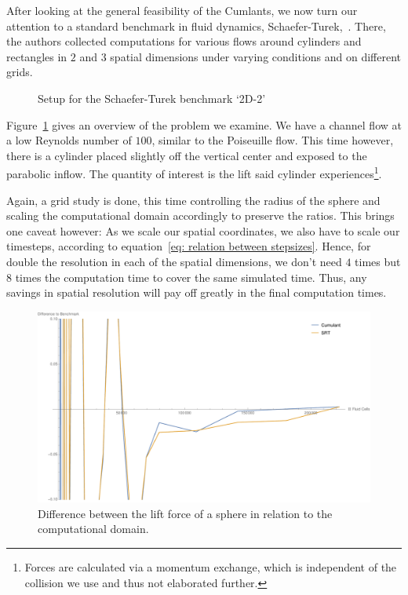 After looking at the general feasibility of the Cumlants, we now turn our attention to a standard benchmark in fluid dynamics, Schaefer-Turek,~\cite{schafer1996benchmark}.
There, the authors collected computations for various flows around cylinders and rectangles in $2$ and $3$ spatial dimensions under varying conditions and on different grids.

\begin{figure}
  \centering
  
  \caption{Setup for the Schaefer-Turek benchmark `2D-2'}
\label{fig: schaeferTurek}
\end{figure}

Figure~\ref{fig: schaeferTurek} gives an overview of the problem we examine.
We have a channel flow at a low Reynolds number of $100$, similar to the Poiseuille flow.
This time however, there is a cylinder placed slightly off the vertical center and exposed to the parabolic inflow.
The quantity of interest is the lift said cylinder experiences\footnote{Forces are calculated via a momentum exchange, which is independent of the collision we use and thus not elaborated further.}.

Again, a grid study is done, this time controlling the radius of the sphere and scaling the computational domain accordingly to preserve the ratios.
This brings one caveat however:
As we scale our spatial coordinates, we also have to scale our timesteps, according to equation~\eqref{eq: relation between stepsizes}.
Hence, for double the resolution in each of the spatial dimensions, we don't need $4$ times but $8$ times the computation time to cover the same simulated time.
Thus, any savings in spatial resolution will pay off greatly in the final computation times.


\begin{figure}
  \centering
  \includegraphics[width=\linewidth]{../figures/schaeferTurekLift_nrFluidVsDiff.pdf} %
  \caption{Difference between the lift force of a sphere in relation to the computational domain.}
\label{fig: schaefer turek nrFluidVsDiff}
\end{figure}

